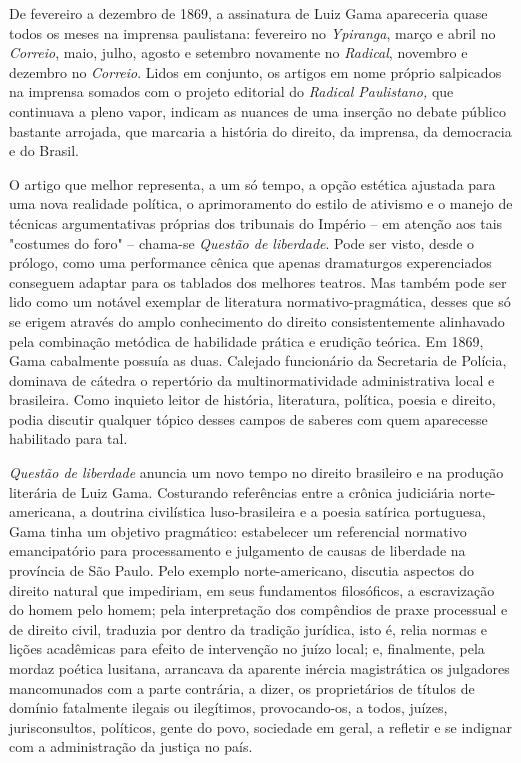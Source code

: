 De fevereiro a dezembro de 1869, a assinatura de Luiz Gama apareceria
quase todos os meses na imprensa paulistana: fevereiro no \emph{Ypiranga}, 
março e abril no \emph{Correio}, maio, julho, agosto e
setembro novamente no \emph{Radical}, novembro e dezembro no
\emph{Correio}. Lidos em conjunto, os artigos em nome próprio salpicados
na imprensa somados com o projeto editorial do \emph{Radical
Paulistano,} que continuava a pleno vapor, indicam as nuances de uma
inserção no debate público bastante arrojada, que marcaria a história do
direito, da imprensa, da democracia e do Brasil.

O artigo que melhor representa, a um só tempo, a opção estética ajustada
para uma nova realidade política, o aprimoramento do estilo de ativismo
e o manejo de técnicas argumentativas próprias dos tribunais do Império
-- em atenção aos tais "costumes do foro" -- chama-se \emph{Questão de
liberdade}. Pode ser visto, desde o prólogo, como uma performance cênica
que apenas dramaturgos experenciados conseguem adaptar para os tablados
dos melhores teatros. Mas também pode ser lido como um notável exemplar
de literatura normativo-pragmática, desses que só se erigem através do
amplo conhecimento do direito consistentemente alinhavado pela
combinação metódica de habilidade prática e erudição teórica. Em 1869,
Gama cabalmente possuía as duas. Calejado funcionário da Secretaria de
Polícia, dominava de cátedra o repertório da multinormatividade
administrativa local e brasileira. Como inquieto leitor de história,
literatura, política, poesia e direito, podia discutir qualquer tópico
desses campos de saberes com quem aparecesse habilitado para tal.

\emph{Questão de liberdade} anuncia um novo tempo no direito brasileiro
e na produção literária de Luiz Gama. Costurando referências entre a
crônica judiciária norte-americana, a doutrina civilística
luso-brasileira e a poesia satírica portuguesa, Gama tinha um objetivo
pragmático: estabelecer um referencial normativo emancipatório para
processamento e julgamento de causas de liberdade na província de São
Paulo. Pelo exemplo norte-americano, discutia aspectos do direito
natural que impediriam, em seus fundamentos filosóficos, a escravização
do homem pelo homem; pela interpretação dos compêndios de praxe
processual e de direito civil, traduzia por dentro da tradição jurídica,
isto é, relia normas e lições acadêmicas para efeito de intervenção no
juízo local; e, finalmente, pela mordaz poética lusitana, arrancava da
aparente inércia magistrática os julgadores mancomunados com a parte
contrária, a dizer, os proprietários de títulos de domínio fatalmente
ilegais ou ilegítimos, provocando-os, a todos, juízes, jurisconsultos,
políticos, gente do povo, sociedade em geral, a refletir e se indignar
com a administração da justiça no país.

